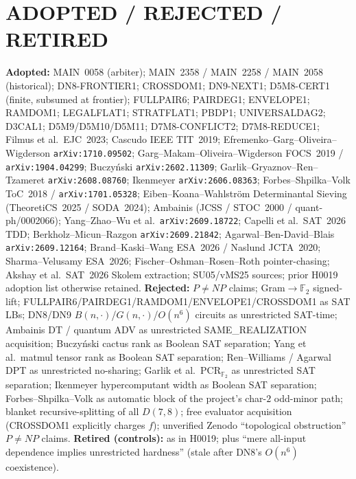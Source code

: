 \documentclass[11pt]{article}
\begin{document}
\section*{ADOPTED / REJECTED / RETIRED}
\textbf{Adopted:} MAIN~0058 (arbiter); MAIN~2358 / MAIN~2258 / MAIN~2058
(historical); DN8-FRONTIER1; CROSSDOM1; DN9-NEXT1; D5M8-CERT1 (finite,
subsumed at frontier); FULLPAIR6; PAIRDEG1; ENVELOPE1; RAMDOM1; LEGALFLAT1;
STRATFLAT1; PBDP1; UNIVERSALDAG2; D3CAL1; D5M9/D5M10/D5M11; D7M8-CONFLICT2;
D7M8-REDUCE1; Filmus et al.\ EJC~2023; Cascudo IEEE TIT~2019;
Efremenko--Garg--Oliveira--Wigderson \texttt{arXiv:1710.09502};
Garg--Makam--Oliveira--Wigderson FOCS~2019 / \texttt{arXiv:1904.04299};
Buczy\'nski \texttt{arXiv:2602.11309}; Garlik--Gryaznov--Ren--Tzameret
\texttt{arXiv:2608.08760}; Ikenmeyer \texttt{arXiv:2606.08363};
Forbes--Shpilka--Volk ToC~2018 / \texttt{arXiv:1701.05328};
Eiben--Koana--Wahlstr\"om Determinantal Sieving (TheoretiCS~2025 / SODA~2024);
Ambainis (JCSS / STOC~2000 / quant-ph/0002066); Yang--Zhao--Wu et al.\
\texttt{arXiv:2609.18722}; Capelli et al.\ SAT~2026 TDD;
Berkholz--Micun--Razgon \texttt{arXiv:2609.21842}; Agarwal--Ben-David--Blais
\texttt{arXiv:2609.12164}; Brand--Kaski--Wang ESA~2026 / Naslund JCTA~2020;
Sharma--Velusamy ESA~2026; Fischer--Oshman--Rosen--Roth pointer-chasing;
Akshay et al.\ SAT~2026 Skolem extraction; SU05/vMS25 sources; prior H0019
adoption list otherwise retained.
\textbf{Rejected:} $P\neq NP$ claims; Gram$\to\mathbb F_2$ signed-lift;
FULLPAIR6/PAIRDEG1/RAMDOM1/ENVELOPE1/CROSSDOM1 as SAT LBs; DN8/DN9
$B(n,\cdot)$/$G(n,\cdot)$/$O(n^6)$ circuits as unrestricted SAT-time;
Ambainis DT / quantum ADV as unrestricted SAME\_REALIZATION acquisition;
Buczy\'nski cactus rank as Boolean SAT separation; Yang et al.\ matmul tensor
rank as Boolean SAT separation; Ren--Williams / Agarwal DPT as unrestricted
no-sharing; Garlik et al.\ PCR$_{\mathbb F_2}$ as unrestricted SAT separation;
Ikenmeyer hypercomputant width as Boolean SAT separation;
Forbes--Shpilka--Volk as automatic block of the project's char-$2$ odd-minor
path; blanket recursive-splitting of all $D(7,8)$; free evaluator acquisition
(CROSSDOM1 explicitly charges $f$); unverified Zenodo ``topological
obstruction'' $P\neq NP$ claims.
\textbf{Retired (controls):} as in H0019; plus ``mere all-input dependence
implies unrestricted hardness'' (stale after DN8's $O(n^6)$ coexistence).
\end{document}
